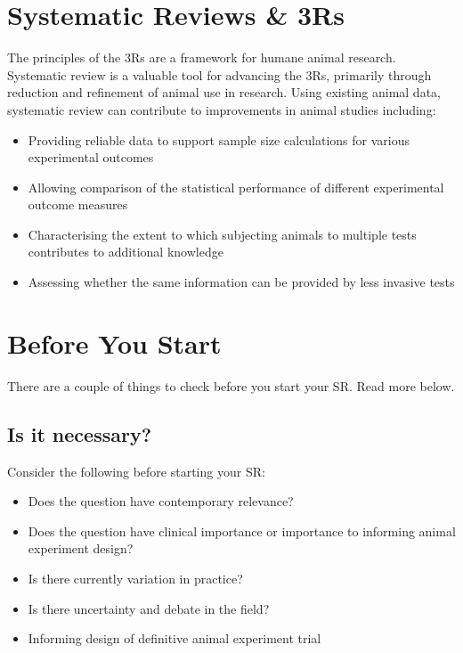 \documentclass[
]{book}
\providecommand{\tightlist}{%
  \setlength{\itemsep}{0pt}\setlength{\parskip}{0pt}}
\begin{document}
\hypertarget{srs-3rs}{%
\chapter{Systematic Reviews \& 3Rs}\label{srs-3rs}}

The principles of the 3Rs are a framework for humane animal research. Systematic review is a valuable tool for advancing the 3Rs, primarily through reduction and refinement of animal use in research. Using existing animal data, systematic review can contribute to improvements in animal studies including:

\begin{itemize}
\tightlist
\item
  Providing reliable data to support sample size calculations for various experimental outcomes
\item
  Allowing comparison of the statistical performance of different experimental outcome measures
\item
  Characterising the extent to which subjecting animals to multiple tests contributes to additional knowledge
\item
  Assessing whether the same information can be provided by less invasive tests
\end{itemize}

\hypertarget{b4ustart}{%
\chapter{Before You Start}\label{b4ustart}}

There are a couple of things to check before you start your SR. Read more below.

\hypertarget{is-it-necessary}{%
\section{Is it necessary?}\label{is-it-necessary}}

Consider the following before starting your SR:

\begin{itemize}
\tightlist
\item
  Does the question have contemporary relevance?
\item
  Does the question have clinical importance or importance to informing animal experiment design?
\item
  Is there currently variation in practice?
\item
  Is there uncertainty and debate in the field?
\item
  Informing design of definitive animal experiment trial
\end{itemize}
\end{document}
